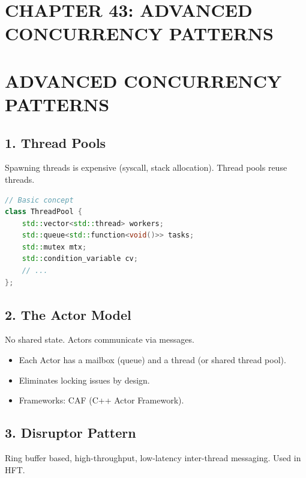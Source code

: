 \hypertarget{chapter-43-advanced-concurrency-patterns}{%
\section{CHAPTER 43: ADVANCED CONCURRENCY
PATTERNS}\label{chapter-43-advanced-concurrency-patterns}}

\hypertarget{advanced-concurrency-patterns}{%
\section{ADVANCED CONCURRENCY
PATTERNS}\label{advanced-concurrency-patterns}}

\hypertarget{thread-pools}{%
\subsection{1. Thread Pools}\label{thread-pools}}

Spawning threads is expensive (syscall, stack allocation). Thread pools
reuse threads.

\begin{lstlisting}[language={C++}]
// Basic concept
class ThreadPool {
    std::vector<std::thread> workers;
    std::queue<std::function<void()>> tasks;
    std::mutex mtx;
    std::condition_variable cv;
    // ...
};
\end{lstlisting}

\hypertarget{the-actor-model}{%
\subsection{2. The Actor Model}\label{the-actor-model}}

No shared state. Actors communicate via messages.

\begin{itemize}
\tightlist
\item
  Each Actor has a mailbox (queue) and a thread (or shared thread pool).
\item
  Eliminates locking issues by design.
\item
  Frameworks: CAF (C++ Actor Framework).
\end{itemize}

\hypertarget{disruptor-pattern}{%
\subsection{3. Disruptor Pattern}\label{disruptor-pattern}}

Ring buffer based, high-throughput, low-latency inter-thread messaging.
Used in HFT.

